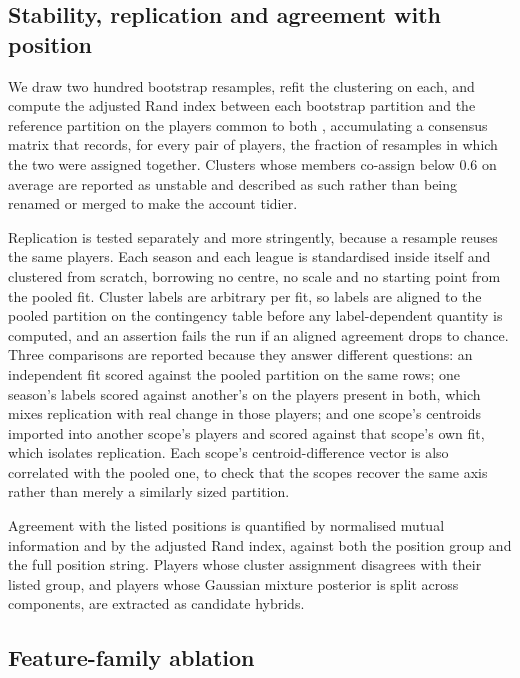 \subsection{Stability, replication and agreement with position}

We draw two hundred bootstrap resamples, refit the clustering on each, and compute the adjusted
Rand index between each bootstrap partition and the reference partition on the players common to
both \citep{hubert1985comparing}, accumulating a consensus matrix that records, for every pair of
players, the fraction of resamples in which the two were assigned together. Clusters whose
members co-assign below 0.6 on average are reported as unstable and described as such rather
than being renamed or merged to make the account tidier.

Replication is tested separately and more stringently, because a resample reuses the same
players. Each season and each league is standardised inside itself and clustered from scratch,
borrowing no centre, no scale and no starting point from the pooled fit. Cluster labels are
arbitrary per fit, so labels are aligned to the pooled partition on the contingency table before
any label-dependent quantity is computed, and an assertion fails the run if an aligned agreement
drops to chance. Three comparisons are reported because they answer different questions: an
independent fit scored against the pooled partition on the same rows; one season's labels scored
against another's on the players present in both, which mixes replication with real change in
those players; and one scope's centroids imported into another scope's players and scored against
that scope's own fit, which isolates replication. Each scope's centroid-difference vector is also
correlated with the pooled one, to check that the scopes recover the same axis rather than merely
a similarly sized partition.

Agreement with the listed positions is quantified by normalised mutual information and by the
adjusted Rand index, against both the position group and the full position string. Players whose
cluster assignment disagrees with their listed group, and players whose Gaussian mixture
posterior is split across components, are extracted as candidate hybrids.

\subsection{Feature-family ablation}

